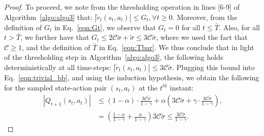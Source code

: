 \documentclass{article}
\newcommand{\mc}{\mathcal}
\begin{document}
\begin{proof}
To proceed, we note from the thresholding operation in lines [6-9] of Algorithm~\ref{algo:algo3} that: $|\tilde{r}_t(s_t, a_t)| \leq G_t, \forall t \geq 0$. Moreover, from the definition of $G_t$ in Eq.~\eqref{eqn:Gt}, we observe that $G_t = 0$ for all $t \leq \bar{T}$. Also, for all $t > \bar{T}$, we further have that $G_t \leq 2 \mc{C} \tilde{\sigma} + \tilde{\sigma} \le 3 \mc{C} \tilde{\sigma}$, where we used the fact that $\mc{C} \geq 1$, and the definition of $\bar{T}$ in Eq.~\eqref{eqn:Tbar}. 
 We thus conclude that in light of the thresholding step in Algorithm~\ref{algo:algo3}, the following holds deterministically at all time-steps: $|\tilde{r}_t(s_t, a_t)| \leq 3 \mc{C} \tilde{\sigma}.$
Plugging this bound into Eq.~\eqref{eqn:trivial_bb}, and using the induction hypothesis, we obtain the following for the sampled state-action pair \((s_t,a_t)\) at the \(t^{th}\) instant:
\begin{equation*}
\begin{aligned}
\left| Q_{t+1}(s_t, a_t) \right|
&\le (1 - \alpha) \cdot \frac{3 \mathcal{C} \tilde{\sigma}}{1 - \gamma} + \alpha \left( 3 \mathcal{C} \tilde{\sigma} + \gamma \cdot \frac{3 \mathcal{C}\tilde{\sigma}}{1 - \gamma} \right), \\
&= \left( \frac{1-\alpha}{1-\gamma} + \frac{\alpha}{1-\gamma}\right)3 \mathcal{C} \tilde{\sigma} \le \frac{3 \mathcal{C} \tilde{\sigma}}{1 - \gamma}.
\end{aligned}
\end{equation*}


\end{proof}
\end{document}
